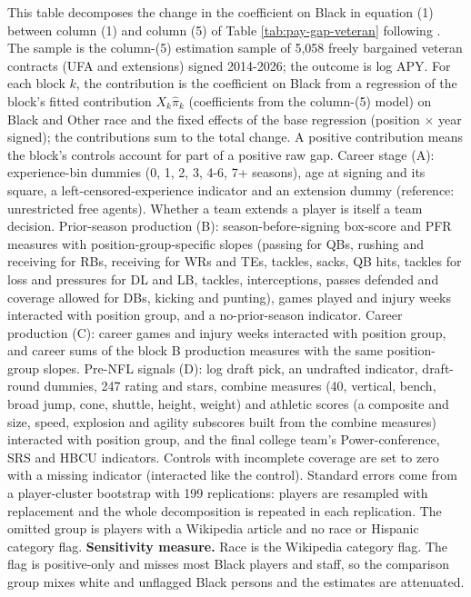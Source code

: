 \begin{table}[!h]
\begin{threeparttable}
\begin{tablenotes}[para]
\item This table decomposes the change in the coefficient on Black in equation (1) between column (1) and column (5) of Table \ref{tab:pay-gap-veteran} following \citet{gelbach2016covariates}. The sample is the column-(5) estimation sample of 5,058 freely bargained veteran contracts (UFA and extensions) signed 2014-2026; the outcome is log APY. For each block $k$, the contribution is the coefficient on Black from a regression of the block's fitted contribution $X_k\hat\pi_k$ (coefficients from the column-(5) model) on Black and Other race and the fixed effects of the base regression (position $\times$ year signed); the contributions sum to the total change. A positive contribution means the block's controls account for part of a positive raw gap. Career stage (A): experience-bin dummies (0, 1, 2, 3, 4-6, 7+ seasons), age at signing and its square, a left-censored-experience indicator and an extension dummy (reference: unrestricted free agents). Whether a team extends a player is itself a team decision. Prior-season production (B): season-before-signing box-score and PFR measures with position-group-specific slopes (passing for QBs, rushing and receiving for RBs, receiving for WRs and TEs, tackles, sacks, QB hits, tackles for loss and pressures for DL and LB, tackles, interceptions, passes defended and coverage allowed for DBs, kicking and punting), games played and injury weeks interacted with position group, and a no-prior-season indicator. Career production (C): career games and injury weeks interacted with position group, and career sums of the block B production measures with the same position-group slopes. Pre-NFL signals (D): log draft pick, an undrafted indicator, draft-round dummies, 247 rating and stars, combine measures (40, vertical, bench, broad jump, cone, shuttle, height, weight) and athletic scores (a composite and size, speed, explosion and agility subscores built from the combine measures) interacted with position group, and the final college team's Power-conference, SRS and HBCU indicators. Controls with incomplete coverage are set to zero with a missing indicator (interacted like the control). Standard errors come from a player-cluster bootstrap with 199 replications: players are resampled with replacement and the whole decomposition is repeated in each replication. The omitted group is players with a Wikipedia article and no race or Hispanic category flag. \textbf{Sensitivity measure.} Race is the Wikipedia category flag. The flag is positive-only and misses most Black players and staff, so the comparison group mixes white and unflagged Black persons and the estimates are attenuated.
\end{tablenotes}
\end{threeparttable}
\end{table}

